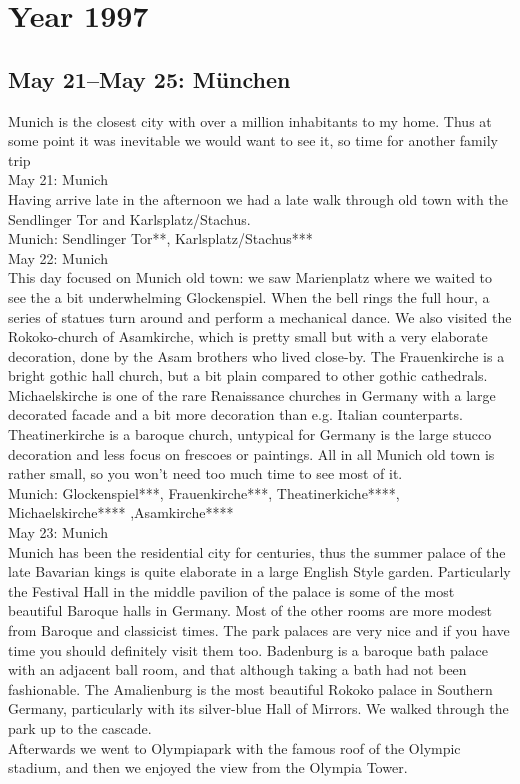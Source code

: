 \chapter{Year 1997}
\label{1997}

\section{May 21--May 25: M\"unchen}
\label{1997:Muenchen}


Munich is the closest city with over a million inhabitants to my home. Thus at some point it was inevitable we would want to see it, so time for another family trip\\

May 21: Munich\\
Having arrive late in the afternoon we had a late walk through old town with the Sendlinger Tor and Karlsplatz/Stachus.\\

Munich: Sendlinger Tor**, Karlsplatz/Stachus***\\

May 22: Munich\\
This day focused on Munich old town: we saw Marienplatz where we waited to see the a bit underwhelming Glockenspiel. When the bell rings the full hour, a series of statues turn around and perform a mechanical dance. We also visited the Rokoko-church of Asamkirche, which is pretty small but with a very elaborate decoration, done by the Asam brothers who lived close-by. The Frauenkirche is a bright gothic hall church, but a bit plain compared to other gothic cathedrals. Michaelskirche is one of the rare Renaissance churches in Germany with a large decorated facade and a bit more decoration than e.g. Italian counterparts. Theatinerkirche is a baroque church, untypical for Germany is the large stucco decoration and less focus on frescoes or paintings. All in all Munich old town is rather small, so you won't need too much time to see most of it.\\

Munich: Glockenspiel***, Frauenkirche***, Theatinerkiche****, Michaelskirche**** ,Asamkirche**** \\

May 23: Munich\\
Munich has been the residential city for centuries, thus the summer palace of the late Bavarian kings is quite elaborate in a large English Style garden. Particularly the Festival Hall in the middle pavilion of the palace is some of the most beautiful Baroque halls in Germany. Most of the other rooms are more modest from Baroque and classicist times. The park palaces are very nice and if you have time you should definitely visit them too. Badenburg is a baroque bath palace with an adjacent ball room, and that although taking a bath had not been fashionable. The Amalienburg is the most beautiful Rokoko palace in Southern Germany, particularly with its silver-blue Hall of Mirrors. We walked through the park up to the cascade.\\
Afterwards we went to Olympiapark with the famous roof of the Olympic stadium, and then we enjoyed the view from the Olympia Tower.\\

